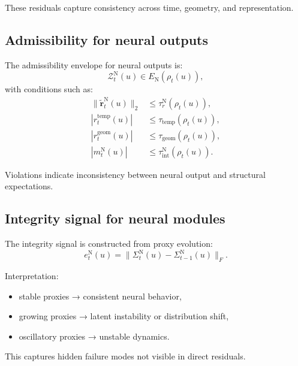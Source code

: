 \documentclass[11pt,letterpaper]{article}
\theoremstyle{gcresult}
\theoremstyle{definition}
\begin{document}
These residuals capture consistency across time, geometry, and representation.


\subsection{Admissibility for neural outputs}

The admissibility envelope for neural outputs is:
\begin{equation}
\mathcal{Z}^{\mathrm{N}}_t(u)\in E_{\mathrm{N}}(\rho_t(u)),
\end{equation}
with conditions such as:
\begin{align}
\|\tilde{\mathbf r}^{\mathrm{N}}_t(u)\|_2 &\le \tau_r^{\mathrm{N}}(\rho_t(u)),\\
|r^{\mathrm{temp}}_t(u)| &\le \tau_{\mathrm{temp}}(\rho_t(u)),\\
|r^{\mathrm{geom}}_t(u)| &\le \tau_{\mathrm{geom}}(\rho_t(u)),\\
|m^{\mathrm{N}}_t(u)| &\le \tau_{\mathrm{int}}^{\mathrm{N}}(\rho_t(u)).
\end{align}

Violations indicate inconsistency between neural output and structural expectations.


\subsection{Integrity signal for neural modules}

The integrity signal is constructed from proxy evolution:
\begin{equation}
e^{\mathrm{N}}_t(u)=\|\Sigma^{\mathrm{N}}_t(u)-\Sigma^{\mathrm{N}}_{t-1}(u)\|_F.
\end{equation}

Interpretation:
\begin{itemize}[leftmargin=1.5em]
    \item stable proxies → consistent neural behavior,
    \item growing proxies → latent instability or distribution shift,
    \item oscillatory proxies → unstable dynamics.
\end{itemize}

This captures hidden failure modes not visible in direct residuals.
\end{document}
